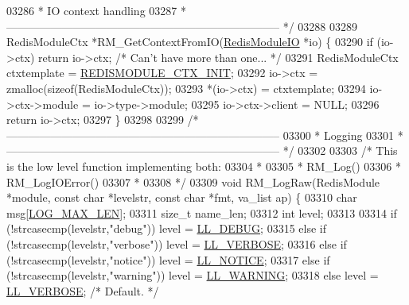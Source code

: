 \begin{DoxyCode}
{{{{{{{{{03286 \textcolor{comment}{ * IO context handling}
03287 \textcolor{comment}{ * -------------------------------------------------------------------------- */}
03288 
03289 RedisModuleCtx *RM\_GetContextFromIO(\hyperlink{structRedisModuleIO}{RedisModuleIO} *io) \{
03290     \textcolor{keywordflow}{if} (io->ctx) \textcolor{keywordflow}{return} io->ctx; \textcolor{comment}{/* Can't have more than one... */}
03291     RedisModuleCtx ctxtemplate = \hyperlink{module_8c_a7a80fb134c35b70c7cfe920ea1033bcd}{REDISMODULE\_CTX\_INIT};
03292     io->ctx = zmalloc(\textcolor{keyword}{sizeof}(RedisModuleCtx));
03293     *(io->ctx) = ctxtemplate;
03294     io->ctx->module = io->type->module;
03295     io->ctx->client = NULL;
03296     \textcolor{keywordflow}{return} io->ctx;
03297 \}
03298 
03299 \textcolor{comment}{/* --------------------------------------------------------------------------}
03300 \textcolor{comment}{ * Logging}
03301 \textcolor{comment}{ * -------------------------------------------------------------------------- */}
03302 
03303 \textcolor{comment}{/* This is the low level function implementing both:}
03304 \textcolor{comment}{ *}
03305 \textcolor{comment}{ *      RM\_Log()}
03306 \textcolor{comment}{ *      RM\_LogIOError()}
03307 \textcolor{comment}{ *}
03308 \textcolor{comment}{ */}
03309 \textcolor{keywordtype}{void} RM\_LogRaw(RedisModule *module, \textcolor{keyword}{const} \textcolor{keywordtype}{char} *levelstr, \textcolor{keyword}{const} \textcolor{keywordtype}{char} *fmt, va\_list ap) \{
03310     \textcolor{keywordtype}{char} msg[\hyperlink{server_8h_a37cd05cbfd7fb52ad21d3a822cff2ee6}{LOG\_MAX\_LEN}];
03311     size\_t name\_len;
03312     \textcolor{keywordtype}{int} level;
03313 
03314     \textcolor{keywordflow}{if} (!strcasecmp(levelstr,\textcolor{stringliteral}{"debug"})) level = \hyperlink{server_8h_abcaffe365dee628fcf9fc90c69d534a1}{LL\_DEBUG};
03315     \textcolor{keywordflow}{else} \textcolor{keywordflow}{if} (!strcasecmp(levelstr,\textcolor{stringliteral}{"verbose"})) level = \hyperlink{server_8h_a479b60032f8da6d8ad72e1a9d0809950}{LL\_VERBOSE};
03316     \textcolor{keywordflow}{else} \textcolor{keywordflow}{if} (!strcasecmp(levelstr,\textcolor{stringliteral}{"notice"})) level = \hyperlink{server_8h_a8c54c191e436c7dd3012167212692401}{LL\_NOTICE};
03317     \textcolor{keywordflow}{else} \textcolor{keywordflow}{if} (!strcasecmp(levelstr,\textcolor{stringliteral}{"warning"})) level = \hyperlink{server_8h_a31229b9334bba7d6be2a72970967a14b}{LL\_WARNING};
03318     \textcolor{keywordflow}{else} level = \hyperlink{server_8h_a479b60032f8da6d8ad72e1a9d0809950}{LL\_VERBOSE}; \textcolor{comment}{/* Default. */}
}}}}}}}}}
\end{DoxyCode}
